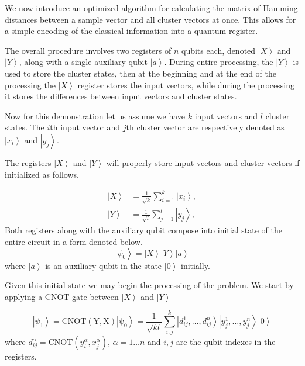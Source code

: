 \documentclass[pra,showkeys,twocolumn,showpacs]{revtex4-1}
\begin{document}
We now introduce an optimized algorithm for calculating the matrix of Hamming distances \cite{trugenberger2001} between a sample vector and all cluster vectors at once.  
This allows for a simple encoding of the classical information into a quantum register.

The overall procedure involves two registers of $n$ qubits each, denoted $\left| X \right\rangle$ and $\left| Y \right\rangle$, along with a single auxiliary qubit $\left| a \right\rangle$. 
During entire processing, the $\left| Y \right\rangle$ is used to store the cluster states, 
then at the beginning and at the end of the processing the $\left| X \right\rangle$ register stores the input vectors, 
while during the processing it stores the differences between input vectors and cluster states.

Now for this demonstration let us assume we have $k$ input vectors and $l$ cluster states. 
The $i$th input vector and $j$th cluster vector are respectively denoted as $\left| x_i \right\rangle$ and $\left| y_j \right\rangle$.

The registers $\left| X \right\rangle$ and $\left| Y \right\rangle$ will properly store input vectors and cluster vectors if initialized as follows.

%
\begin{align}
    \left| X \right\rangle  & = \frac{1}{\sqrt{k}} \sum\limits_{i=1}^{k} \left| x_i \right\rangle,  \\
    \left| Y \right\rangle&  = \frac{1}{\sqrt{l}} \sum\limits_{j=1}^{l} \left| y_j \right\rangle,
    \label{eq:encodnig}
\end{align}
% 
Both registers along with the auxiliary qubit compose into initial state of the entire circuit in a form denoted below. 
%
\begin{equation} 
\left| \psi_0 \right\rangle = 
    \left| X \right\rangle
    \left| Y \right\rangle 
    \left| a \right\rangle
    \label{eq:initial_state}
\end{equation}
%
where $\left| a \right\rangle$ is an auxiliary qubit in the state $\left| 0 \right\rangle$ initially.

Given this initial state we may begin the processing of the problem. 
We start by applying a CNOT gate between $\left| X \right\rangle$ and $\left| Y \right\rangle$

\begin{equation}
    \left| \psi_1 \right\rangle = 
    \mathrm{CNOT(Y,X)\left| \psi_0 \right\rangle} =  
    \frac{1}{\sqrt{kl}} \sum\limits_{i, j}^{k} 
    \left| d^1_{ij}, \dots, d^n_{ij} \right\rangle 
    \left| y^1_j, \dots, y^n_j \right\rangle
    \left| 0 \right\rangle 
\end{equation}
where $d^\alpha_{ij} = \mathrm{CNOT}(y^\alpha_i, x^\alpha_j),\, \alpha = 1 \dots n$ and $i,j$ are the qubit indexes in the registers.
\end{document}
